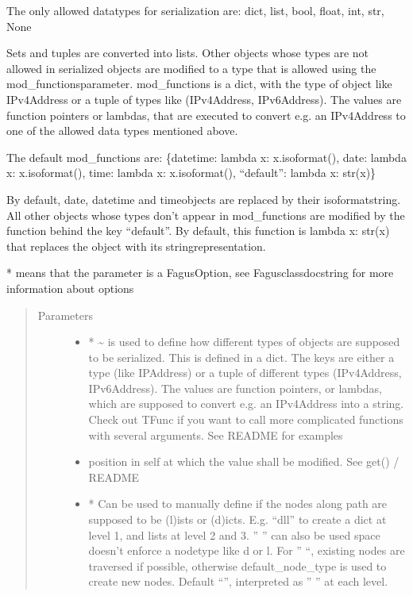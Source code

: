 \documentclass[a4paper,10pt,english]{sphinxmanual}
\begin{document}
\begin{fulllineitems}
\begin{fulllineitems}
\sphinxAtStartPar
The only allowed data\sphinxhyphen{}types for serialization are: dict, list, bool, float, int, str, None

\sphinxAtStartPar
Sets and tuples are converted into lists. Other objects whose types are not allowed in serialized objects are
modified to a type that is allowed using the mod\_functions\sphinxhyphen{}parameter. mod\_functions is a dict, with the type
of object like IPv4Address or a tuple of types like (IPv4Address, IPv6Address). The values are function pointers
or lambdas, that are executed to convert e.g. an IPv4Address to one of the allowed data types mentioned above.

\sphinxAtStartPar
The default mod\_functions are: \{datetime: lambda x: x.isoformat(), date: lambda x: x.isoformat(), time:
lambda x: x.isoformat(), “default”: lambda x: str(x)\}

\sphinxAtStartPar
By default, date, datetime and time\sphinxhyphen{}objects are replaced by their isoformat\sphinxhyphen{}string. All other objects whose
types don’t appear in mod\_functions are modified by the function behind the key “default”. By default, this
function is lambda x: str(x) that replaces the object with its string\sphinxhyphen{}representation.

\sphinxAtStartPar
* means that the parameter is a FagusOption, see Fagus\sphinxhyphen{}class\sphinxhyphen{}docstring for more information about options
\begin{quote}\begin{description}
\item[{Parameters}] \leavevmode\begin{itemize}
\item {}
\sphinxAtStartPar
{} \textendash{} * \textasciitilde{} is used to define how different types of objects are supposed to be serialized. This is
defined in a dict. The keys are either a type (like IPAddress) or a tuple of different types
(IPv4Address, IPv6Address). The values are function pointers, or lambdas, which are supposed to convert
e.g. an IPv4Address into a string. Check out TFunc if you want to call more complicated functions with
several arguments. See README for examples

\item {}
\sphinxAtStartPar
{} \textendash{} position in self at which the value shall be modified. See get() / README

\item {}
\sphinxAtStartPar
{} \textendash{} * Can be used to manually define if the nodes along path are supposed to be (l)ists or
(d)icts. E.g. “dll” to create a dict at level 1, and lists at level 2 and 3. ” ” can also be used \sphinxhyphen{}
space doesn’t enforce a node\sphinxhyphen{}type like d or l. For ” “, existing nodes are traversed if possible,
otherwise default\_node\_type is used to create new nodes. Default “”, interpreted as ” ” at each level.


\end{itemize}
\end{description}
\end{quote}
\end{fulllineitems}
\end{fulllineitems}
\end{document}
